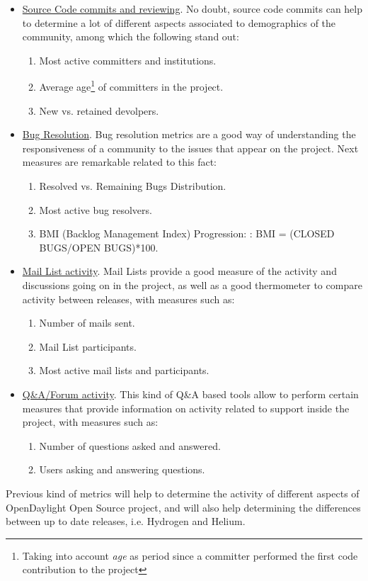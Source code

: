 \documentclass[a4paper, 12pt]{book}
\begin{document}
\begin{itemize}\itemsep0pt
\item{\underline{Source Code commits and reviewing}}. No doubt, source code commits can help to determine a lot of different aspects associated to demographics of the community, among which the following stand out:
\begin{enumerate}\itemsep0pt
\item{Most active committers and institutions}.
\item{Average age\footnote{Taking into account \emph{age} as period since a committer performed the first code contribution to the project} of committers in the project}.
\item{New vs. retained devolpers}.
\end{enumerate}
\item{\underline{Bug Resolution}}. Bug resolution metrics are a good way of understanding the responsiveness of a community to the issues that appear on the project. Next measures are remarkable related to this fact:
\begin{enumerate}\itemsep0pt
\item{Resolved vs. Remaining Bugs Distribution}.
\item{Most active bug resolvers}.
\item{BMI (Backlog Management Index) Progression: : BMI = (CLOSED BUGS/OPEN BUGS)*100}.
\end{enumerate}
\item{\underline{Mail List activity}}. Mail Lists provide a good measure of the activity and discussions going on in the project, as well as a good thermometer to compare activity between releases, with measures such as:
\begin{enumerate}\itemsep0pt
\item{Number of mails sent}.
\item{Mail List participants}.
\item{Most active mail lists and participants}.
\end{enumerate}
\item{\underline{Q\&A/Forum activity}}. This kind of Q\&A based tools allow to perform certain measures that provide information on activity related to support inside the project, with measures such as:
\begin{enumerate}\itemsep0pt
\item{Number of questions asked and answered}.
\item{Users asking and answering questions}.
\end{enumerate}
\end{itemize}
Previous kind of metrics will help to determine the activity of different aspects of OpenDaylight Open Source project, and will also help determining the differences between up to date releases, i.e. Hydrogen and Helium.
\end{document}
